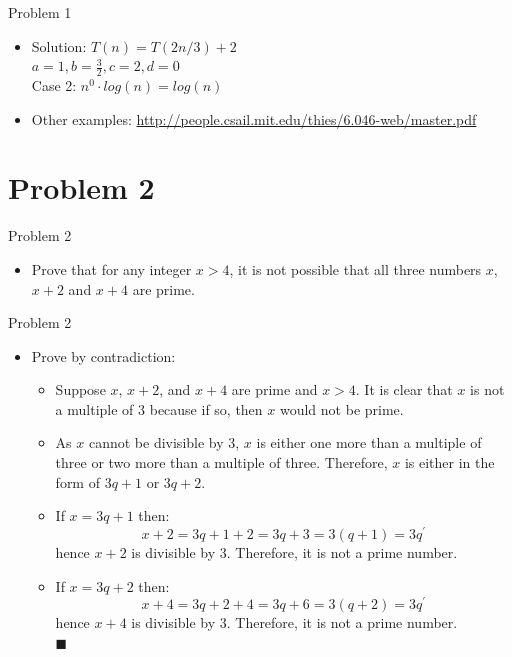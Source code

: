 \documentclass{beamer}
\begin{document}
\begin{frame}{Problem 1}
   \begin{itemize}
        \item Solution:
            $T(n) = T(2n/3) + 2$
            \\ $a = 1, b = \frac{3}{2}, c = 2, d = 0$
            \\ Case 2: $n^0 \cdot log(n) = log(n)$
       \item Other examples: \url{http://people.csail.mit.edu/thies/6.046-web/master.pdf}      
    \end{itemize}
\end{frame}

\section{Problem 2}

\begin{frame}{Problem 2}
   \begin{itemize}
          \item  Prove that for any integer $x>4$, it is not possible that all three numbers $x$, $x + 2$ and $x + 4$ are prime.
      \end{itemize}
\end{frame}

\begin{frame}{Problem 2}
   \begin{itemize}
        \item  Prove by contradiction:
        \begin{itemize}
            \item Suppose $x$, $x+2$, and $x+4$ are prime and $x > 4$.  It is clear that $x$ is not a multiple of 3 because if so, then $x$ would not be prime. 
            \item As $x$ cannot be divisible by 3, $x$ is either one more than a multiple of three or two more than a multiple of three.  Therefore, $x$ is either in the form of $3q + 1$ or $3q + 2$.  
            \item If $x = 3q + 1$ then: $$x + 2 = 3q + 1 + 2 = 3q + 3 = 3(q + 1) = 3q^{\prime}$$ hence $x + 2$ is divisible by 3. Therefore, it is not a prime number.
            \item If $x = 3q + 2$ then: $$x + 4 = 3q + 2 + 4 = 3q + 6 = 3(q + 2) = 3q^{\prime}$$ hence $x + 4$ is divisible by 3. Therefore, it is not a prime number.
            \\ \hspace{10cm} {\tiny $\blacksquare$}
        \end{itemize}
    \end{itemize}
\end{frame}
\end{document}
